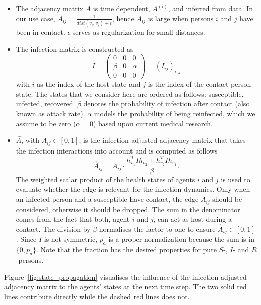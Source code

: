 \begin{itemize}
	\item The adjacency matrix $A$ is time dependent, $A^{(l)}$, and inferred from data. In our use case, $A_{ij} = \frac{1}{dist(v_i, v_j)+\epsilon}$, hence $A_{ij}$ is large when persons $i$ and $j$ have been in contact. $\epsilon$ serves as regularization for small distances.
	\item The infection matrix is constructed as
	\begin{equation}
	I =
	\begin{pmatrix}
	0     &  0  & 0 \\
	\beta &  0  & \alpha \\
	0     &  0  & 0
	\end{pmatrix}
	=
	(I_{ij})_{i,j}
	\end{equation}
	with $i$ as the index of the host state and $j$ is the index of the contact person state. The states that we consider here are ordered as follows: susceptible, infected, recovered. $\beta$ denotes the probability of infection  after contact (also known as attack rate). $\alpha$ models the probability of being reinfected, which we assume to be zero ($\alpha=0$) based upon current medical research.
	\item $\hat{A}$, with $\hat{A}_{ij}\in [0, 1]$, is the infection-adjusted adjacency matrix that takes the infection interactions into account and is computed as follows
	\begin{equation}
	\hat{A}_{ij} = A_{ij}\cdot \frac{ h_{v_1}^T I h_{v_2} + h_{v_2}^T I h_{v_1} }{\beta}.
	\end{equation}
	The weighted scalar product of the health states of agents $i$ and $j$ is used to evaluate whether the edge is relevant for the infection dynamics. Only when an infected person and a susceptible have contact, the edge $A_{ij}$ should be considered, otherwise it should be dropped.	The sum in the denominator comes from the fact that both, agent $i$ and $j$, can act as host during a contact. The division by $\beta$ normalises the factor to one to ensure $\hat{A}_{ij} \in [0, 1]$. Since $I$ is not symmetric, $p_a$ is a proper normalization because the sum is in $\{0, p_a\}$. Note that the fraction has the desired properties for pure $S$-, $I$- and $R$-persons.
\end{itemize}

Figure~\ref{fig:state_propagation} visualises the influence of the infection-adjusted adjacency matrix to the agents' states at the next time step. The two solid red lines contribute directly while the dashed red lines does not.

